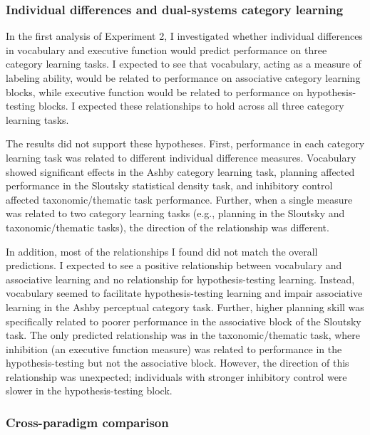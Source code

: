 \documentclass[../dissertation.tex]{subfiles}
\begin{document}
\subsubsection{Individual differences and dual-systems category learning}

	In the first analysis of Experiment 2, I investigated whether individual differences in vocabulary and executive function would predict performance on three category learning tasks. I expected to see that vocabulary, acting as a measure of labeling ability, would be related to performance on associative category learning blocks, while executive function would be related to performance on hypothesis-testing blocks. I expected these relationships to hold across all three category learning tasks. \par
	The results did not support these hypotheses. First, performance in each category learning task was related to different individual difference measures. Vocabulary showed significant effects in the Ashby category learning task, planning affected performance in the Sloutsky statistical density task, and inhibitory control affected taxonomic/thematic task performance. Further, when a single measure was related to two category learning tasks (e.g., planning in the Sloutsky and taxonomic/thematic tasks), the direction of the relationship was different. \par 
	In addition, most of the relationships I found did not match the overall predictions. I expected to see a positive relationship between vocabulary and associative learning and no relationship for hypothesis-testing learning. Instead, vocabulary seemed to facilitate hypothesis-testing learning and impair associative learning in the Ashby perceptual category task. Further, higher planning skill was specifically related to poorer performance in the associative block of the Sloutsky task. The only predicted relationship was in the taxonomic/thematic task, where inhibition (an executive function measure) was related to performance in the hypothesis-testing but not the associative block. However, the direction of this relationship was unexpected; individuals with stronger inhibitory control were slower in the hypothesis-testing block.
	
\subsubsection{Cross-paradigm comparison}
\end{document}
